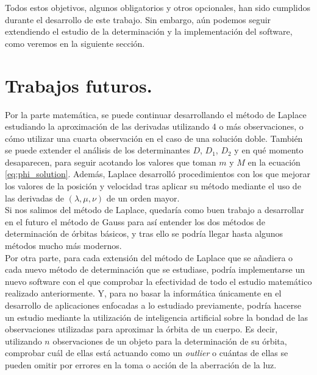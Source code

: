 Todos estos objetivos, algunos obligatorios y otros opcionales, han sido cumplidos durante el desarrollo de este trabajo. Sin embargo, aún podemos seguir extendiendo el estudio de la determinación y la implementación del software, como veremos en la siguiente sección.\\



\section{Trabajos futuros.}
Por la parte matemática, se puede continuar desarrollando el método de Laplace estudiando la aproximación de las derivadas utilizando 4 o más observaciones, o cómo utilizar una cuarta observación en el caso de una solución doble. También se puede extender el análisis de los determinantes $D$, $D_1$, $D_2$ y en qué momento desaparecen, para seguir acotando los valores que toman $m$ y $M$ en la ecuación \eqref{eq:phi_solution}. Además, Laplace desarrolló procedimientos con los que mejorar los valores de la posición y velocidad tras aplicar su método mediante el uso de las derivadas de $(\lambda,\mu,\nu)$ de un orden mayor.\\

Si nos salimos del método de Laplace, quedaría como buen trabajo a desarrollar en el futuro el método de Gauss para así entender los dos métodos de determinación de órbitas básicos, y tras ello se podría llegar hasta algunos métodos mucho más modernos.\\

Por otra parte, para cada extensión del método de Laplace que se añadiera o cada nuevo método de determinación que se estudiase, podría implementarse un nuevo software con el que comprobar la efectividad de todo el estudio matemático realizado anteriormente. Y, para no basar la informática únicamente en el desarrollo de aplicaciones enfocadas a lo estudiado previamente, podría hacerse un estudio mediante la utilización de inteligencia artificial sobre la bondad de las observaciones utilizadas para aproximar la órbita de un cuerpo. Es decir, utilizando $n$ observaciones de un objeto para la determinación de su órbita, comprobar cuál de ellas está actuando como un \textit{outlier} o cuántas de ellas se pueden omitir por errores en la toma o acción de la aberración de la luz.


